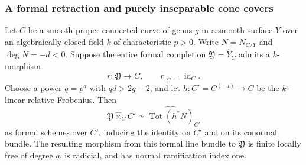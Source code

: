 \subsubsection{A formal retraction and purely inseparable cone covers}

\begin{lemma}
\label{D:formal-retraction-cone-cover}
Let $C$ be a smooth proper connected curve of genus $g$ in a
smooth surface $Y$ over an algebraically closed field $k$ of
characteristic $p>0$.  Write $N=N_{C/Y}$ and $\deg N=-d<0$.
Suppose the entire formal completion $\mathfrak Y=\widehat Y_C$
admits a $k$-morphism
\[
                  r:\mathfrak Y\longrightarrow C,
                  \qquad r|_C=\operatorname{id}_C.
\]
Choose a power $q=p^a$ with $qd>2g-2$, and let
$h:C'=C^{(-a)}\to C$ be the $k$-linear relative Frobenius.
Then
\[
 \mathfrak Y\mathbin{\widehat\times}_C C'
       \simeq\widehat{\operatorname{Tot}(h^*N)}_{C'}
\]
as formal schemes over $C'$, inducing the identity on $C'$
and on its conormal bundle.  The resulting morphism from
this formal line bundle to $\mathfrak Y$ is finite locally
free of degree $q$, is radicial, and has normal ramification
index one.
\end{lemma}

